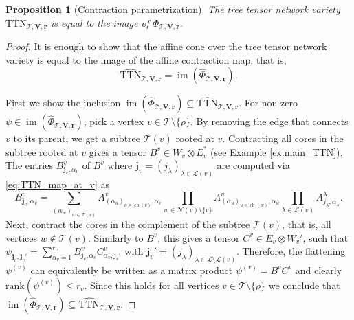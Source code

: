 \documentclass[12pt]{article}
\newtheorem{proposition}[theorem]{Proposition}
\theoremstyle{definition}
\numberwithin{theorem}{section}
\begin{document}
\begin{proposition}[Contraction parametrization]
\label{prop:contraction parametrization}
The tree tensor network variety
$\mathrm{TTN}_{\mathscr{T}, \mathbf{V}, \mathbf{r}}$ is equal to the image of 
$\Phi_{\mathscr{T}, \mathbf{V}, \mathbf{r}}$.
\end{proposition}
\begin{proof}
It is enough to show that the affine cone over the tree tensor network variety is equal to the image of
the affine contraction map, that is, 
\begin{equation*}
    \widehat{\mathrm{TTN}}_{\mathscr T,\mathbf V,\mathbf r}
    =
    \operatorname{im}
    \left(
    \widehat{\Phi}_{\mathscr T,\mathbf V,\mathbf r}
    \right).
\end{equation*}

First we show the inclusion $\operatorname{im}
    (
    \widehat{\Phi}_{\mathscr T,\mathbf V,\mathbf r}
    ) \subseteq \widehat{\mathrm{TTN}}_{\mathscr T,\mathbf V,\mathbf r}$.
 For non-zero $\psi \in \operatorname{im}(\widehat{\Phi}_{\mathscr T,\mathbf V,\mathbf r})$, pick a vertex $v \in \mathscr T \setminus \{\rho\}$. By removing the edge that connects $v$ to its parent, we get a subtree $\mathscr{T}(v)$ rooted at $v$.  Contracting all cores in the subtree rooted at $v$ gives a tensor $B^v \in W_v \otimes E_v^*$ (see Example \ref{ex:main_TTN}).
The entries $B^v_{\mathbf j_v, \alpha_v}$
of $B^v$ where $\mathbf j_v  = (j_\lambda)_{\lambda \in \mathscr L(v)}$
are computed via \eqref{eq:TTN_map_at_v} as
\begin{equation*}
    B^v_{\mathbf j_v, \alpha_v} = \sum_{(\alpha_w)_{w \in \mathscr{T}(v)}}
    A^v_{(\alpha_u)_{u\in\operatorname{ch}(v)}, \alpha_v}
    \prod_{w\in\mathscr N(v) \setminus\{v\}}
    A^w_{(\alpha_u)_{u\in\operatorname{ch}(w)},\alpha_w}
    \prod_{\lambda\in\mathscr L(v)}
    A^\lambda_{j_\lambda,\alpha_\lambda}.
\end{equation*}
Next, contract the cores in the complement of the subtree $\mathscr{T}(v)$, that is, all vertices $w\notin \mathscr{T}(v)$. Similarly to $B^v$, this gives a tensor $C^v \in E_v\otimes W_v'$,
such that $\psi_{\mathbf j_v, \mathbf j_v'} = \sum_{\alpha_v=1}^{r_v}B^v_{\mathbf j_v, \alpha_v}C^v_{\alpha_v, \mathbf j_v'} $ with $\mathbf j_v'  = (j_\lambda)_{\lambda \in \mathscr{L} \setminus \mathscr{L}(v)}$.
Therefore, the flattening $\psi^{(v)}$ can equivalently be written as a matrix product $\psi^{(v)} = B^vC^v$ and clearly $\mathrm{rank}(\psi^{(v)}) \leq r_v$.
Since this holds for all vertices $v\in\mathscr T \setminus \{\rho\}$ we conclude that 
$\operatorname{im}(\widehat{\Phi}_{\mathscr T,\mathbf V,\mathbf r}) \subseteq \widehat{\mathrm{TTN}}_{\mathscr T,\mathbf V,\mathbf r}$.


\end{proof}
\end{document}
